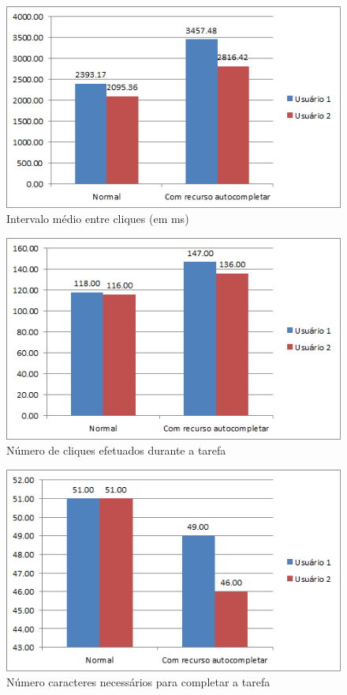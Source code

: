 \documentclass[twoside]{article}
\begin{document}
\begin{multicols}{2}
\begin{figure}[H]
\label{fig:graph_int}
  \caption{Intervalo médio entre cliques (em ms)}
  \centering
    \includegraphics[scale = 0.50]{graph_intervalomed.png}
\end{figure}

\begin{figure}[H]
\label{fig:graph_numcliq}
  \caption{Número de cliques efetuados durante a tarefa}
  \centering
    \includegraphics[scale = 0.50]{graph_ncliques.png}
\end{figure}

\begin{figure}[H]
\label{fig:graph_numcaractnec}
  \caption{Número caracteres necessários para completar a tarefa}
  \centering
    \includegraphics[scale = 0.50]{graph_caractnec.png}
\end{figure}


\end{multicols}
\end{document}
